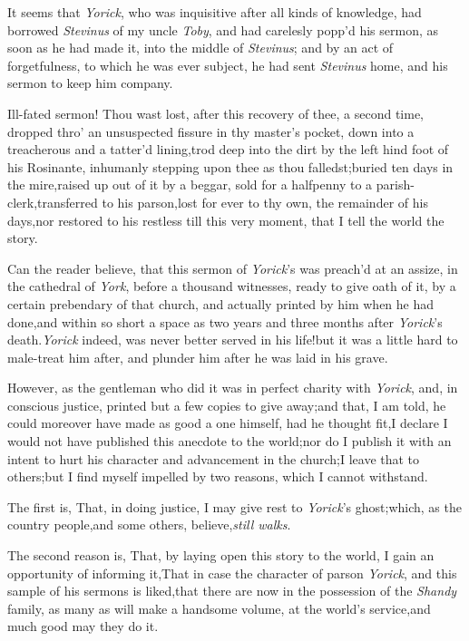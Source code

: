 \documentclass{article}
\begin{document}
It seems that \textit{Yorick}, who was inquisitive after all kinds
of knowledge, had borrowed \textit{Stevinus} of my uncle \textit{Toby},
and had carelesly popp’d his sermon, as soon as he had made it,
into the middle of \textit{Stevinus}; and by an act of forgetfulness,
to which he was ever subject, he had sent \textit{Stevinus} home, and
his sermon to keep him company.

Ill-fated sermon! Thou wast lost, after this recovery of thee, a
second time, dropped thro’ an unsuspected fissure in thy
master’s pocket, down into a treacherous and a tatter’d
lining,\tsk trod deep into the dirt by the left hind foot of
his Rosinante, inhumanly stepping upon thee as thou
falledst;\tsk buried ten days in the mire,\tsh raised up
out of it by a beggar, sold for a halfpenny to a
parish-clerk,\tsk\break transferred to his
parson,\tsh lost for ever to thy own, the remainder of his
days,\tsk\break nor restored to his restless  till
this very moment, that I tell the world the story.

Can the reader believe, that this sermon of
\textit{Yorick}’s was preach’d at an assize, in the cathedral
of \textit{York}, before a thousand witnesses, ready to give oath of
it, by a certain prebendary of that church, and actually printed by
him when he had done,\tsh and within so short a space as
two years and three months after \textit{Yorick}’s
death.\tsk \textit{Yorick} indeed, was never better served in his
life!\tsh but it was a little hard to male-treat him after,
and plunder him after he was laid in his grave.

However, as the gentleman who did it was in perfect charity with
\textit{Yorick},\tsk\break
and, in conscious justice, printed but a
few copies to give away;\tsk and that, I am told, he could
moreover have made as good a one himself, had he thought
fit,\break \tsk I declare I would not have published this
anecdote to the world;\tsk nor do I publish it with an intent to
hurt his character and advancement in the church;\tsk\break I
leave that to others;\tsh but I find myself impelled by two
reasons, which I cannot withstand.

The first is, That, in doing justice, I may give rest to
\textit{Yorick}’s ghost;\tsk which,\break
as the country people,\tsk and some others,\break
believe,\tsh \textit{still walks}.

The second reason is, That, by laying open this story to the
world, I gain an opportunity of informing it,\tsk That in case
the character of parson \textit{Yorick}, and this sample of his
sermons is liked,\tsh that
there are now in the possession of
the \textit{Shandy} family, as many as will make a handsome volume,
at the world’s service,\tsh and much good may they\break
do it.
\end{document}

